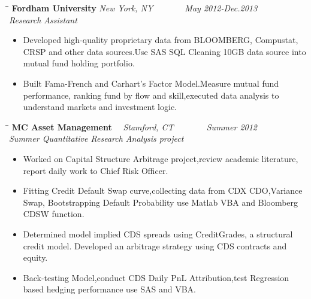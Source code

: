 \documentclass{res}
\begin{document}
\begin{resume}
\begin{itemize}
\end{itemize}
\vspace{-20pt}	
  \begin{tabbing}
   \hspace{2.3in}\= \hspace{2.3in}\= \kill %
    {\bf Fordham University} \> \it{New York, NY} \> ~~~~~~ May 2012-Dec.2013\\
    \it Research Assistant\\
   \end{tabbing}
   \vspace{-20pt}
\begin{itemize}
\item Developed high-quality proprietary data from  BLOOMBERG, Compustat, CRSP and other data sources.Use SAS SQL Cleaning 10GB data source into mutual fund  holding portfolio.
\item Built Fama-French and Carhart's Factor Model.Measure mutual fund performance, ranking fund by flow and skill,executed data analysis to understand markets and  investment logic.
\end{itemize}
     \vspace{-20pt}
   \begin{tabbing}
   \hspace{2.3in}\= \hspace{2.3in}\= \kill %
    {\bf MC Asset Management} \>\ \ \it{Stamford, CT}     \>\ \ \ \ \ \ \ Summer 2012\\
     \it Summer Quantitative Research Analysis project\\
	 \end{tabbing}
\vspace{-20pt}      %
\begin{itemize}
\item Worked on Capital Structure Arbitrage project,review academic literature, report daily work to Chief Risk Officer.
\item Fitting Credit Default Swap curve,collecting data from CDX CDO,Variance Swap, Bootstrapping Default Probability use Matlab VBA and Bloomberg CDSW function.
\item Determined model implied CDS spreads using CreditGrades, a structural credit model. Developed an arbitrage strategy using CDS contracts and equity.
\item Back-testing Model,conduct CDS Daily PnL Attribution,test Regression based hedging performance use SAS and VBA.
\end{itemize}
\vspace{-10pt}



\end{resume}
\end{document}
